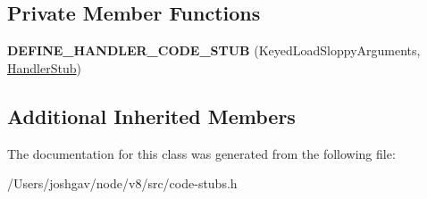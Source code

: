 \subsection*{Private Member Functions}
\begin{DoxyCompactItemize}
\item 
{\bfseries D\+E\+F\+I\+N\+E\+\_\+\+H\+A\+N\+D\+L\+E\+R\+\_\+\+C\+O\+D\+E\+\_\+\+S\+T\+UB} (Keyed\+Load\+Sloppy\+Arguments, \hyperlink{classv8_1_1internal_1_1_handler_stub}{Handler\+Stub})\hypertarget{classv8_1_1internal_1_1_keyed_load_sloppy_arguments_stub_acdd572b67e42bcc6f0cb21b1ad3e5038}{}\label{classv8_1_1internal_1_1_keyed_load_sloppy_arguments_stub_acdd572b67e42bcc6f0cb21b1ad3e5038}

\end{DoxyCompactItemize}
\subsection*{Additional Inherited Members}


The documentation for this class was generated from the following file\+:\begin{DoxyCompactItemize}
\item 
/\+Users/joshgav/node/v8/src/code-\/stubs.\+h\end{DoxyCompactItemize}

